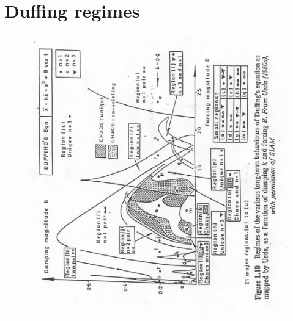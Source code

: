 \documentclass[a4paper, 11pt]{article}
\begin{document}
\section{Duffing regimes}
\begin{figure}[htp]
\centering
\includegraphics[scale=1.5]{img/ex4/duffingscheme.eps}
\caption{}
\label{fig:ex4duffingscheme}
\end{figure}
\end{document}

